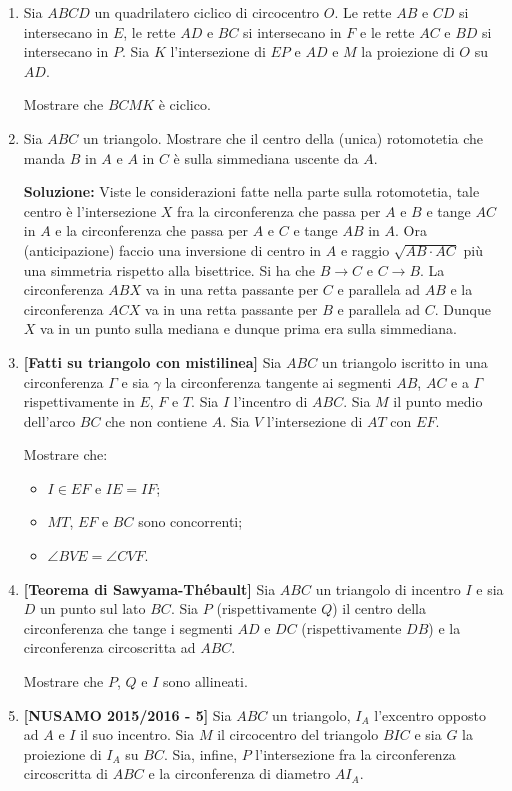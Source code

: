\begin{enumerate}
	\item Sia $ABCD$ un quadrilatero ciclico di circocentro $O$. Le rette $AB$ e $CD$ si intersecano in $E$, le rette $AD$ e $BC$ si intersecano in $F$ e le rette $AC$ e $BD$ si intersecano in $P$. Sia $K$ l'intersezione di $EP$ e $AD$ e $M$ la proiezione di $O$ su $AD$.
	
	Mostrare che $BCMK$ è ciclico. 
	\item Sia $ABC$ un triangolo. Mostrare che il centro della (unica) rotomotetia che manda $B$ in $A$ e $A$ in $C$ è sulla simmediana uscente da $A$. 
	
	\textbf{Soluzione:} Viste le considerazioni fatte nella parte sulla rotomotetia, tale centro è l'intersezione $X$ fra la circonferenza che passa per $A$ e $B$ e tange $AC$ in $A$ e la circonferenza che passa per $A$ e $C$ e tange $AB$ in $A$.
	Ora (anticipazione) faccio una inversione di centro in $A$ e raggio $\sqrt{AB\cdot AC}$ più una simmetria rispetto alla bisettrice. Si ha che $B\to C$ e $C\to B$. La circonferenza $ABX$ va in una retta passante per $C$ e parallela ad $AB$ e la circonferenza $ACX$ va in una retta passante per $B$ e parallela ad $C$. Dunque $X$ va in un punto sulla mediana e dunque prima era sulla simmediana. 
	\item \textbf{[Fatti su triangolo con mistilinea]} Sia $ABC$ un triangolo iscritto in una circonferenza $\Gamma$ e sia $\gamma$ la circonferenza tangente ai segmenti $AB$, $AC$ e a $\Gamma$ rispettivamente in $E$, $F$ e $T$. Sia $I$ l'incentro di $ABC$. Sia $M$ il punto medio dell'arco $BC$ che non contiene $A$. Sia $V$ l'intersezione di $AT$ con $EF$. 
	
	Mostrare che:
	\begin{itemize}
		\item $I\in EF$ e $IE=IF$;
		\item $MT$, $EF$ e $BC$ sono concorrenti;
		\item $\angle BVE=\angle CVF$.
	\end{itemize}

	\item \textbf{[Teorema di Sawyama-Thébault]} 
	Sia $ABC$ un triangolo di incentro $I$ e sia $D$ un punto sul lato $BC$. Sia $P$ (rispettivamente $Q$) il centro della circonferenza che tange i segmenti $AD$ e $DC$ (rispettivamente $DB$) e la circonferenza circoscritta ad $ABC$. 
	
	Mostrare che $P$, $Q$ e $I$ sono allineati.
	\item \textbf{[NUSAMO 2015/2016 - 5]}
	Sia $ABC$ un triangolo, $I_A$ l'excentro opposto ad $A$
	e $I$ il suo incentro. Sia $M$ il circocentro del triangolo $BIC$ e sia $G$ la proiezione di $I_A$ su $BC$.
	Sia, infine, $P$ l'intersezione fra la circonferenza circoscritta di $ABC$ e la circonferenza di diametro $AI_A$. 
	

\end{enumerate}
